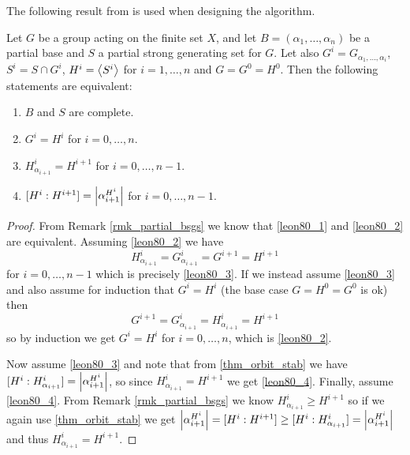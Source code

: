  The following result from \cite{leon80} is used when designing the algorithm.
\begin{theorem} \label{thm_leon}
  Let $G$ be a group acting on the finite set $X$, and let $B =
  (\alpha_1, \dotsc, \alpha_n)$ be a partial base and $S$ a partial
  strong generating set for $G$. Let also $G^i = G_{\alpha_1, \dotsc,
    \alpha_i}$, $S^i = S \cap G^i$, $H^i = \left\langle S^i \right\rangle$ for $i = 1,
  \dotsc, n$ and $G = G^0 = H^0$. Then the following statements are equivalent:
\begin{enumerate}
\item $B$ and $S$ are complete. \label{leon80_1}
\item $G^i = H^i$ for $i = 0, \dotsc, n$. \label{leon80_2}
\item $H^i_{\alpha_{i + 1}} = H^{i + 1}$ for $i = 0, \dotsc, n - 1$. \label{leon80_3}
\item $[H^i : H^{i + 1}] = \left\lvert \alpha_{i+1}^{H^i} \right\rvert$ for $i = 0, \dotsc, n - 1$. \label{leon80_4}
\end{enumerate}
\end{theorem}
\begin{proof}
From Remark \ref{rmk_partial_bsgs} we know that \eqref{leon80_1} and \eqref{leon80_2} are equivalent. Assuming \eqref{leon80_2} we have
\begin{equation}
H^i_{\alpha_{i + 1}} = G^i_{\alpha_{i + 1}} = G^{i + 1} = H^{i + 1}
\end{equation}
for $i = 0, \dotsc, n - 1$ which is precisely \eqref{leon80_3}. If we instead assume \eqref{leon80_3} and also assume for induction that $G^i = H^i$ (the base case $G = H^0 = G^0$ is ok) then
\begin{equation}
G^{i + 1} = G^i_{\alpha_{i + 1}} = H^i_{\alpha_{i + 1}} = H^{i + 1}
\end{equation}
so by induction we get $G^i = H^i$ for $i = 0, \dotsc, n$, which is \eqref{leon80_2}.

Now assume \eqref{leon80_3} and note that from \ref{thm_orbit_stab} we
have $[H^i : H^i_{\alpha_{i + 1}}] = \left\lvert \alpha_{i+1}^{H^i} \right\rvert$, so
since $H^i_{\alpha_{i + 1}} = H^{i + 1}$ we get \eqref{leon80_4}.
Finally, assume \eqref{leon80_4}. From Remark \ref{rmk_partial_bsgs} we know
$H^i_{\alpha_{i + 1}} \geq H^{i + 1}$ so if we again use
\ref{thm_orbit_stab} we get $\left\lvert \alpha_{i+1}^{H^i} \right\rvert = [H^i : H^{i +
  1}] \geq [H^i : H^i_{\alpha_{i + 1}}] = \left\lvert \alpha_{i+1}^{H^i} \right\rvert$
and thus $H^i_{\alpha_{i + 1}} = H^{i + 1}$.
\end{proof}


